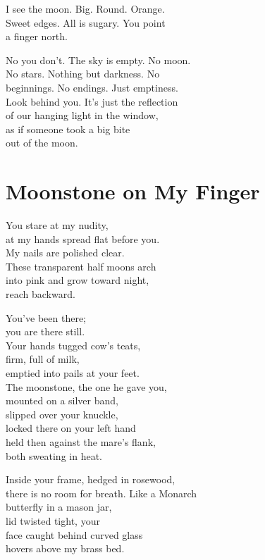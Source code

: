 \documentclass[twoside,10pt]{book}
\begin{document}
I see the moon. Big. Round. Orange.\\
Sweet edges. All is sugary. You point\\
a finger north.

No you don't. The sky is empty. No moon.\\
No stars. Nothing but darkness. No\\
beginnings. No endings. Just emptiness.\\
Look behind you. It's just the reflection\\
of our hanging light in the window,\\
as if someone took a big bite\\
out of the moon.


\clearpage
\section{Moonstone on My Finger}

You stare at my nudity,\\
at my hands spread flat before you.\\
My nails are polished clear.\\
These transparent half moons arch\\
into pink and grow toward night,\\
reach backward.

You've been there;\\
you are there still.\\
Your hands tugged cow's teats,\\
firm, full of milk,\\
emptied into pails at your feet.\\
The moonstone, the one he gave you,\\
mounted on a silver band,\\
slipped over your knuckle,\\
locked there on your left hand\\
held then against the mare's flank,\\
both sweating in heat.

Inside your frame, hedged in rosewood,\\
there is no room for breath. Like a Monarch\\
butterfly in a mason jar,\\
lid twisted tight, your\\
face caught behind curved glass\\
hovers above my brass bed.
\end{document}
